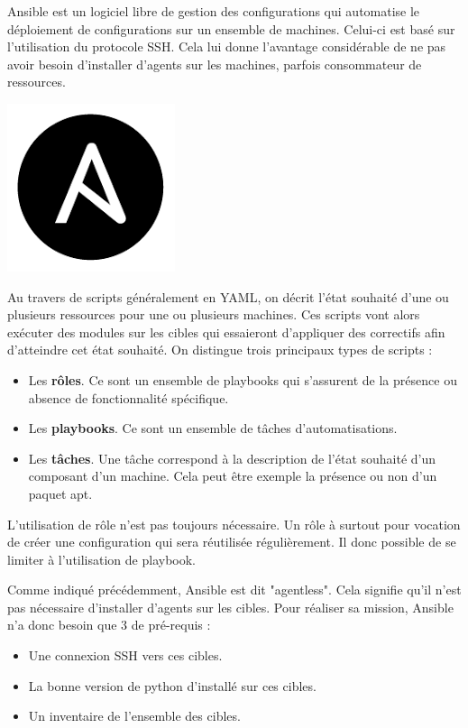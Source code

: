 \documentclass[12pt]{article}
\begin{document}
\noindent%
\begin{minipage}{.8\textwidth}%
Ansible est un logiciel libre de gestion des configurations qui automatise le déploiement de configurations sur un ensemble de machines. 
Celui-ci est basé sur l'utilisation du protocole SSH. 
Cela lui donne l'avantage considérable de ne pas avoir besoin d'installer d'agents sur les machines, parfois consommateur de ressources.

\end{minipage}%
\hfill
\begin{minipage}{.2\textwidth}%
\begin{center}
\includegraphics[scale=0.3]{src/ansible.png}
\end{center}
\end{minipage}%

Au travers de scripts généralement en YAML, on décrit l'état souhaité d'une ou plusieurs ressources pour une ou plusieurs machines. 
Ces scripts vont alors exécuter des modules sur les cibles qui essaieront d'appliquer des correctifs afin d'atteindre cet état souhaité. 
On distingue trois principaux types de scripts :
\begin{itemize}
    \item Les \textbf{rôles}. Ce sont un ensemble de playbooks qui s'assurent de la présence ou absence de fonctionnalité spécifique.
    \item Les \textbf{playbooks}. Ce sont un ensemble de tâches d'automatisations.
    \item Les \textbf{tâches}. Une tâche correspond à la description de l'état souhaité d'un composant d'un machine. 
    Cela peut être exemple la présence ou non d'un paquet apt.
\end{itemize}

L'utilisation de rôle n'est pas toujours nécessaire. 
Un rôle à surtout pour vocation de créer une configuration qui sera réutilisée régulièrement. 
Il donc possible de se limiter à l'utilisation de playbook.

Comme indiqué précédemment, Ansible est dit "agentless". 
Cela signifie qu'il n'est pas nécessaire d'installer d'agents sur les cibles. 
Pour réaliser sa mission, Ansible n'a donc besoin que 3 de pré-requis :
\begin{itemize}
    \item Une connexion SSH vers ces cibles.
    \item La bonne version de python d'installé sur ces cibles.
    \item Un inventaire de l'ensemble des cibles.
\end{itemize}
\end{document}
